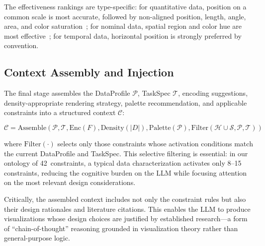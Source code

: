 \documentclass[final,5p,times,twocolumn]{elsarticle}
\begin{document}
The effectiveness rankings are type-specific: for quantitative data, position on a common scale is most accurate, followed by non-aligned position, length, angle, area, and color saturation~\cite{cleveland1984graphical,heer2010crowdsourcing}; for nominal data, spatial region and color hue are most effective~\cite{mackinlay1986automating}; for temporal data, horizontal position is strongly preferred by convention.

\subsection{Context Assembly and Injection}

The final stage assembles the DataProfile $\mathcal{P}$, TaskSpec $\mathcal{T}$, encoding suggestions, density-appropriate rendering strategy, palette recommendation, and applicable constraints into a structured context $\mathcal{C}$:

\begin{equation}
\mathcal{C} = \text{Assemble}(\mathcal{P}, \mathcal{T}, \text{Enc}(F), \text{Density}(|D|), \text{Palette}(\mathcal{P}), \text{Filter}(\mathcal{H} \cup \mathcal{S}, \mathcal{P}, \mathcal{T}))
\end{equation}

where $\text{Filter}(\cdot)$ selects only those constraints whose activation conditions match the current DataProfile and TaskSpec. This selective filtering is essential: in our ontology of 42~constraints, a typical data characterization activates only 8--15 constraints, reducing the cognitive burden on the LLM while focusing attention on the most relevant design considerations.

Critically, the assembled context includes not only the constraint rules but also their design rationales and literature citations. This enables the LLM to produce visualizations whose design choices are justified by established research---a form of ``chain-of-thought'' reasoning grounded in visualization theory rather than general-purpose logic.






\end{document}
